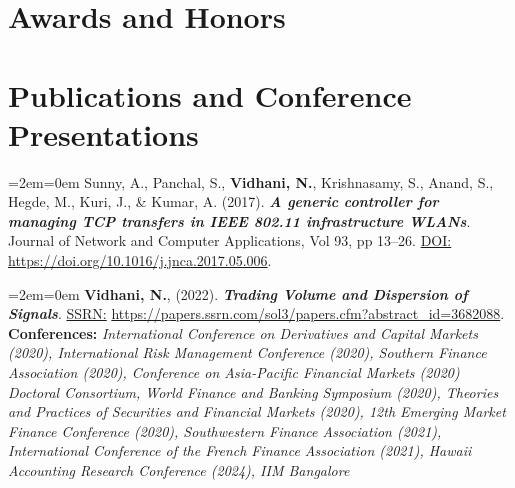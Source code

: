 \documentclass[11pt,a4paper,]{moderncv}
\begin{document}
\hypertarget{awards-and-honors}{%
\section{Awards and Honors}\label{awards-and-honors}}

\nopagebreak

\hypertarget{publications-and-conference-presentations}{%
\section{Publications and Conference
Presentations}\label{publications-and-conference-presentations}}

\begingroup
\setlength{\parindent}{-0.5in}
\setlength{\leftskip}{0.5in}

\bgroup %
  \par%
  \medskip
  \leftskip=2em\rightskip=0em%
  \noindent\ignorespaces
Sunny, A., Panchal, S., \textbf{Vidhani, N.}, Krishnasamy, S., Anand, S., Hegde, M., Kuri, J., \& Kumar, A. (2017).
\textbf{\textit{A generic controller for managing TCP transfers in IEEE 802.11 infrastructure WLANs}}. Journal of Network and Computer Applications, Vol 93, pp 13--26. \underline{DOI:} \url{https://doi.org/10.1016/j.jnca.2017.05.006}.\\
%
  \par\medskip\egroup

\bgroup %
  \par%
  \medskip
  \leftskip=2em\rightskip=0em%
  \noindent\ignorespaces
\textbf{Vidhani, N.}, (2022). \textbf{\textit{Trading Volume and Dispersion of Signals}}. \underline{SSRN:} \url{https://papers.ssrn.com/sol3/papers.cfm?abstract_id=3682088}.\\
\textbf{Conferences:} \textit{International Conference on Derivatives and Capital Markets (2020), International Risk Management Conference (2020), Southern Finance Association (2020), Conference on Asia-Pacific Financial Markets (2020) Doctoral Consortium, World Finance and Banking Symposium (2020), Theories and Practices of Securities and Financial Markets (2020), 12th Emerging Market Finance Conference (2020), Southwestern Finance Association (2021), International Conference of the French Finance Association (2021), Hawaii Accounting Research Conference (2024), IIM Bangalore}\\
%
  \par\medskip\egroup
\end{document}
